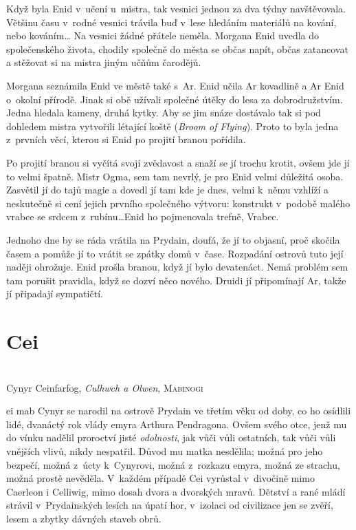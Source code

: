 \documentclass[a4paper,twocolumn,openany,nodeprecatedcode, justified]{dndbook}
\begin{document}
	Když byla Enid v~učení u~mistra, tak vesnici jednou za dva týdny navštěvovala. Většinu času v~rodné vesnici trávila buď v~lese hledáním materiálů na kování, nebo kováním… Na vesnici žádné přátele neměla. Morgana Enid uvedla do společenského života, chodily společně do města se občas napít, občas zatancovat a stěžovat si na mistra jiným učňům čarodějů.
	
	Morgana seznámila Enid ve městě také s~Ar. Enid učila Ar kovadlině a Ar Enid o~okolní přírodě. Jinak si obě užívali společné útěky do lesa za dobrodružstvím. Jedna hledala kameny, druhá kytky. Aby se jim snáze dostávalo tak si pod dohledem mistra vytvořili létající koště (\emph{Broom of Flying}). Proto to byla jedna z~prvních věcí, kterou si Enid po projití branou pořídila.
	
	Po projití branou si vyčítá svojí zvědavost a snaží se jí trochu krotit, ovšem jde jí to velmi špatně.  Mistr Ogma, sem tam nevrlý, je pro Enid velmi důležitá osoba. Zasvětil jí do tajů magie a dovedl jí tam kde je dnes, velmi k~němu vzhlíží a neskutečně si cení jejich prvního společného výtvoru: konstrukt v~podobě malého vrabce se srdcem z~rubínu…Enid ho pojmenovala trefně, Vrabec.
	
	Jednoho dne by se ráda vrátila na Prydain, doufá, že jí to objasní, proč skočila časem a pomůže jí to vrátit se zpátky domů v~čase. Rozpadání ostrovů tuto její naději ohrožuje. Enid prošla branou, když jí bylo devatenáct. Nemá problém sem tam porušit pravidla, když se dozví něco nového. Druidi jí připomínají Ar, takže jí připadají sympatičtí.
	
	
	
	
	
	
	
	\chapter{Cei}
	\begin{DndReadAloud}
		\sffamily
		\raggedright
		\\
		\raggedleft Cynyr Ceinfarfog, \emph{Culhwch a Olwen}, \textsc{Mabinogi}
	\end{DndReadAloud}
	
	ei mab Cynyr se narodil na ostrově Prydain ve třetím věku od doby, co ho osídlili lidé, dvanáctý rok vlády emyra Arthura Pendragona. Ovšem svého otce, jenž mu do vínku nadělil proroctví jisté \emph{odolnosti}, jak vůči vůli ostatních, tak vůči vůli vnějších vlivů, nikdy nespatřil. Důvod mu matka nesdělila; možná pro jeho bezpečí, možná z~úcty k~Cynyrovi, možná z~rozkazu emyra, možná ze strachu, možná prostě nevěděla. V~každém případě Cei vyrůstal v~divočině mimo Caerleon i Celliwig, mimo dosah dvora a dvorských mravů. Dětství a rané mládí strávil v~Prydainských lesích na úpatí hor, v~izolaci od civilizace jen se zvěří, lesem a zbytky dávných staveb obrů. \\
	
\end{document}
